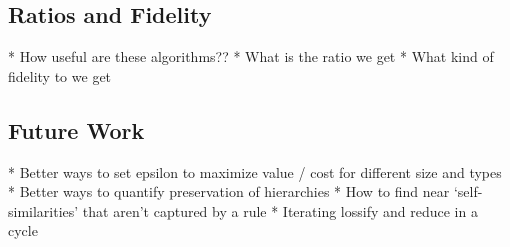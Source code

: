 \documentclass[11pt]{article}
\begin{document}
\subsection{Ratios and Fidelity}

* How useful are these algorithms??
* What is the ratio we get
* What kind of fidelity to we get

\subsection{Future Work}
* Better ways to set epsilon to maximize value / cost for different size and types
* Better ways to quantify preservation of hierarchies
* How to find near `self-similarities' that aren't captured by a rule
* Iterating lossify and reduce in a cycle

\nocite{*}


\end{document}
